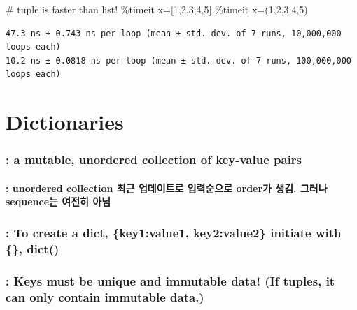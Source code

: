 \documentclass[
  a4paper,
  DIV=11,
  numbers=noendperiod]{scrreprt}
\let\oldparagraph\paragraph
\renewcommand{\paragraph}[1]{\oldparagraph{#1}\mbox{}}
\newenvironment{Shaded}{\begin{snugshade}}{\end{snugshade}}
\newcommand{\CommentTok}[1]{\textcolor[rgb]{0.37,0.37,0.37}{#1}}
\newcommand{\DecValTok}[1]{\textcolor[rgb]{0.68,0.00,0.00}{#1}}
\newcommand{\NormalTok}[1]{\textcolor[rgb]{0.00,0.23,0.31}{#1}}
\newcommand{\OperatorTok}[1]{\textcolor[rgb]{0.37,0.37,0.37}{#1}}
\begin{document}
\begin{Shaded}
\begin{Highlighting}[]
\CommentTok{\# tuple is faster than list!}
\OperatorTok{\%}\NormalTok{timeit x}\OperatorTok{=}\NormalTok{[}\DecValTok{1}\NormalTok{,}\DecValTok{2}\NormalTok{,}\DecValTok{3}\NormalTok{,}\DecValTok{4}\NormalTok{,}\DecValTok{5}\NormalTok{]}
\OperatorTok{\%}\NormalTok{timeit x}\OperatorTok{=}\NormalTok{(}\DecValTok{1}\NormalTok{,}\DecValTok{2}\NormalTok{,}\DecValTok{3}\NormalTok{,}\DecValTok{4}\NormalTok{,}\DecValTok{5}\NormalTok{)}
\end{Highlighting}
\end{Shaded}

\begin{verbatim}
47.3 ns ± 0.743 ns per loop (mean ± std. dev. of 7 runs, 10,000,000 loops each)
10.2 ns ± 0.0818 ns per loop (mean ± std. dev. of 7 runs, 100,000,000 loops each)
\end{verbatim}

\section{Dictionaries}\label{dictionaries}

\subsubsection{: a mutable, unordered collection of key-value
pairs}\label{a-mutable-unordered-collection-of-key-value-pairs}

\paragraph{: unordered collection 최근 업데이트로 입력순으로 order가
생김. 그러나 sequence는 여전히
아님}\label{unordered-collection-uxcd5cuxadfc-uxc5c5uxb370uxc774uxd2b8uxb85c-uxc785uxb825uxc21cuxc73cuxb85c-orderuxac00-uxc0dduxae40.-uxadf8uxb7ecuxb098-sequenceuxb294-uxc5ecuxc804uxd788-uxc544uxb2d8}

\subsubsection{: To create a dict, \{key1:value1, key2:value2\} initiate
with \{\},
dict()}\label{to-create-a-dict-key1value1-key2value2-initiate-with-dict}

\subsubsection{: Keys must be unique and immutable data! (If tuples, it
can only contain immutable
data.)}\label{keys-must-be-unique-and-immutable-data-if-tuples-it-can-only-contain-immutable-data.}
\end{document}

